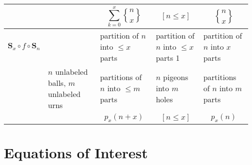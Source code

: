 \documentclass[]{article}
\newcommand{\stirlingii}{\genfrac{\{}{\}}{0pt}{}}
\begin{document}
\begin{tabular}{ | p{.6in} | p{0.9in} || p{1.7in} | p{1.7in} | p{1.7in} |  }
&
& $$\sum_{k=0}^{x} \stirlingii{n}{x}$$
& $$[n \leq x]$$
& $$\stirlingii{n}{x}$$
\\

\hline


\rowcolor{Gray} 
$\mathbf{S}_x \circ f \circ \mathbf{S}_n$
&
& partition of $n$ into $\leq x$ parts
& partition of $n$ into $\leq x$ parts 1
& partition of $n$ into $x$ parts
\\

& $n$ unlabeled balls, $m$ unlabeled urns
& partitions of $n$ into $\leq m$ parts
& $n$ pigeons into $m$ holes
& partitions of $n$ into $m$ parts
\\

& 
& $$p_x(n+x)$$
& $$[n \leq x]$$
& $$p_x(n)$$
\\

\hline
\end{tabular}

\newpage


\section*{Equations of Interest}
\end{document}
